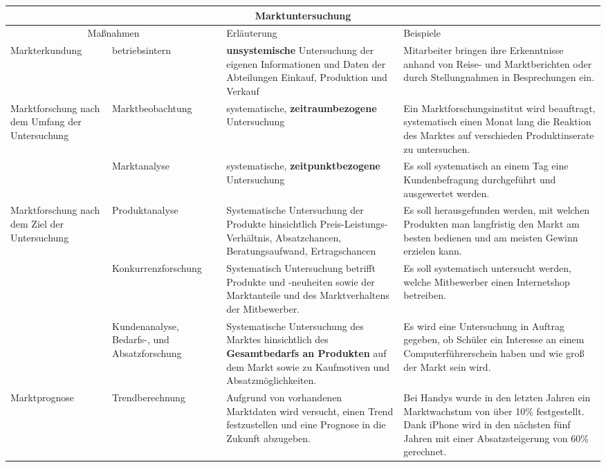 \noindent \begin{tabular}{|p{}|
				 p{}|
				 p{}|
				 p{}|} %
	\hline
	\multicolumn{4}{|c|}{{{\bf{\large Marktuntersuchung}}}} \\
	\hline
	\multicolumn{2}{|c|}{Maßnahmen} & Erläuterung & Beispiele \\
	\hline
Markterkundung & betriebsintern & {\bf unsystemische} Untersuchung der eigenen Informationen und Daten der Abteilungen Einkauf, Produktion und Verkauf & Mitarbeiter bringen ihre Erkenntnisse anhand von Reise- und Marktberichten oder durch Stellungnahmen in Besprechungen ein. \\
	\hline
Marktforschung nach dem Umfang der Untersuchung & Marktbeobachtung
& systematische, {\bf zeitraumbezogene} Untersuchung & Ein Marktforschungsinstitut wird beauftragt, systematisch einen Monat lang die Reaktion des Marktes auf verschieden Produktinserate zu untersuchen. \\
	\cline{2-4}
& Marktanalyse & systematische, {\bf zeitpunktbezogene} Untersuchung & Es soll systematisch an einem Tag eine Kundenbefragung durchgeführt und ausgewertet werden. \\
	\hline
Marktforschung nach dem Ziel der Untersuchung
& Produktanalyse & Systematische Untersuchung der Produkte hinsichtlich Preis-Leistungs-Verhältnis, Absatzchancen, Beratungsaufwand, Ertragschancen & Es soll herausgefunden werden, mit welchen Produkten man langfristig den Markt am besten bedienen und am meisten Gewinn erzielen kann. \\
	\cline{2-4}
& Konkurrenzforschung & Systematisch Untersuchung betrifft Produkte und -neuheiten sowie der Marktanteile und des Marktverhaltens der Mitbewerber. & Es soll systematisch untersucht werden, welche Mitbewerber einen Internetshop betreiben. \\
	\cline{2-4}
& Kundenanalyse, Bedarfs-, und Absatzforschung & Systematische Untersuchung des Marktes hinsichtlich des {\bf Gesamtbedarfs an Produkten} auf dem Markt sowie zu Kaufmotiven und Absatzmöglichkeiten. & Es wird eine Untersuchung in Auftrag gegeben, ob Schüler ein Interesse an einem Computerführerschein haben und wie groß der Markt sein wird. \\
	\hline
Marktprognose & Trendberechnung & Aufgrund von vorhandenen Marktdaten wird versucht, einen Trend festzustellen und eine Prognose in die Zukunft abzugeben. & Bei Handys wurde in den letzten Jahren ein Marktwachstum von über 10\% festgestellt. Dank iPhone wird in den nächsten fünf Jahren mit einer Absatzsteigerung von 60\% gerechnet. \\
	\hline
\end{tabular}

